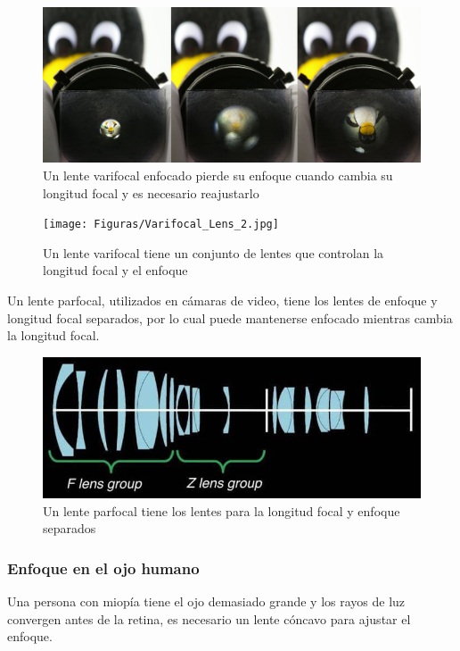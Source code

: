 \documentclass{article}
\begin{document}
\begin{figure}[H]
	\centering
	\includegraphics[width=0.75\linewidth]{Figuras/Varifocal_Lens}
	\caption{Un lente varifocal enfocado pierde su enfoque cuando cambia su longitud focal y es necesario reajustarlo}
	\label{fig:varifocallens}
\end{figure}

\begin{figure}[H]
	\centering
	\texttt{[image: Figuras/Varifocal\_Lens\_2.jpg]}
	\caption{Un lente varifocal tiene un conjunto de lentes que controlan la longitud focal y el enfoque}
	\label{fig:varifocallens2}
\end{figure}

Un lente parfocal, utilizados en cámaras de video, tiene los lentes de enfoque y longitud focal separados, por lo cual puede mantenerse enfocado mientras cambia la longitud focal.

\begin{figure}[H]
	\centering
	\includegraphics[width=0.75\linewidth]{Figuras/Parfocal_Lens}
	\caption{Un lente parfocal tiene los lentes para la longitud focal y enfoque separados}
	\label{fig:parfocallens}
\end{figure}

\pagebreak

\subsubsection{Enfoque en el ojo humano}

Una persona con miopía tiene el ojo demasiado grande y los rayos de luz convergen antes de la retina, es necesario un lente cóncavo para ajustar el enfoque.
\end{document}
